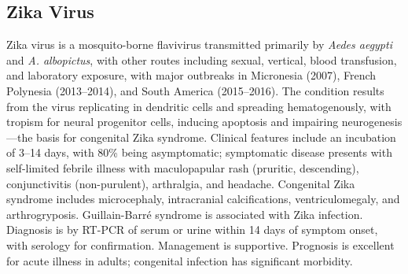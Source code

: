\subsection{Zika Virus}
\label{sec:Zika Virus}
Zika virus is a mosquito-borne flavivirus transmitted primarily by \textit{Aedes aegypti} and \textit{A. albopictus}, with other routes including sexual, vertical, blood transfusion, and laboratory exposure, with major outbreaks in Micronesia (2007), French Polynesia (2013--2014), and South America (2015--2016). The condition results from the virus replicating in dendritic cells and spreading hematogenously, with tropism for neural progenitor cells, inducing apoptosis and impairing neurogenesis---the basis for congenital Zika syndrome. Clinical features include an incubation of 3--14 days, with 80\% being asymptomatic; symptomatic disease presents with self-limited febrile illness with maculopapular rash (pruritic, descending), conjunctivitis (non-purulent), arthralgia, and headache. Congenital Zika syndrome includes microcephaly, intracranial calcifications, ventriculomegaly, and arthrogryposis. Guillain-Barré syndrome is associated with Zika infection. Diagnosis is by RT-PCR of serum or urine within 14 days of symptom onset, with serology for confirmation. Management is supportive. Prognosis is excellent for acute illness in adults; congenital infection has significant morbidity.

